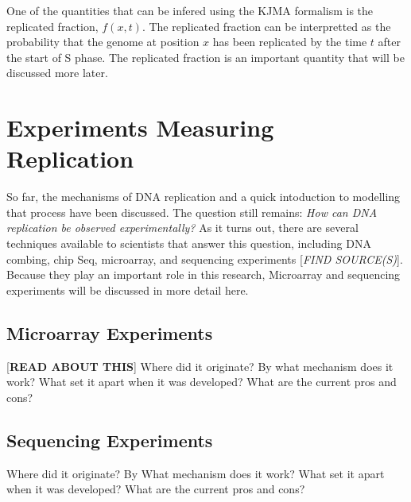 	One of the quantities that can be infered using the KJMA formalism is the replicated fraction, $f(x,t)$.
	The replicated fraction can be interpretted as the probability that the genome at position $x$ has been replicated by the time $t$ after the start of S phase.
	The replicated fraction is an important quantity that will be discussed more later.
	
	
	\section{Experiments Measuring Replication}
	
	So far, the mechanisms of DNA replication and a quick intoduction to modelling that process have been discussed.
	The question still remains:
	\emph{How can DNA replication be observed experimentally?}
	As it turns out, there are several techniques available to scientists that answer this question, including DNA combing, chip Seq, microarray, and sequencing experiments [\emph{FIND SOURCE(S)}].
	Because they play an important role in this research, Microarray and sequencing experiments will be discussed in more detail here.
	
		\subsection{Microarray Experiments}
		
		[\textbf{READ ABOUT THIS}] Where did it originate? By what mechanism does it work? What set it apart when it was developed? What are the current pros and cons?
		
		\subsection{Sequencing Experiments}
		
		Where did it originate? By What mechanism does it work? What set it apart when it was developed? What are the current pros and cons?
		
		
		
		
		
		
		
		
		